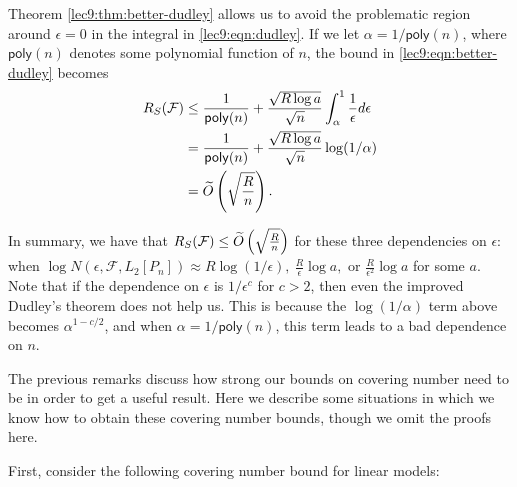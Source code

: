 \begin{enumerate}
Theorem \ref{lec9:thm:better-dudley} allows us to avoid the problematic region around $\epsilon=0$ in the integral in \eqref{lec9:eqn:dudley}. If we let $\alpha = 1/\mathsf{poly}(n)$, where $\mathsf{poly}(n)$ denotes some polynomial function of $n$, the bound in \eqref{lec9:eqn:better-dudley} becomes
\begin{align}
R_S(\mathcal{F}) &\leq \frac{1}{\mathsf{poly}(n)} + \frac{\sqrt{R\log a}}{\sqrt{n}}\int_{\alpha}^1\frac{1}{\epsilon}d\epsilon \\
&= \frac{1}{\mathsf{poly}(n)}  + \frac{\sqrt{R\log a}}{\sqrt{n}} \log(1/\alpha) \\
&= \widetilde{O} \left(\sqrt{\frac{R}{n}}\right).
\end{align}
\end{enumerate}

In summary, we have that $R_S(\mathcal{F}) \leq \widetilde{O}\left(\sqrt{\frac{R}{n}}\right)$ for these three dependencies on $\epsilon$: when $\log N(\epsilon, \mathcal{F}, L_2[P_n]) \approx R\log (1/\epsilon),\ \frac{R}{\epsilon} \log a,\text{ or } \frac{R}{\epsilon^2} \log a$ for some $a$. Note that if the dependence on $\epsilon$ is $1/\epsilon^c$ for $c > 2$, then even the improved Dudley's theorem does not help us. This is because the $\log(1/\alpha)$ term above becomes $\alpha^{1-c/2}$, and when $\alpha = 1/\mathsf{poly}(n)$, this term leads to a bad dependence on $n$.

The previous remarks discuss how strong our bounds on covering number need to be in order to get a useful result. Here we describe some situations in which we know how to obtain these covering number bounds, though we omit the proofs here.

First, consider the following covering number bound for linear models:

